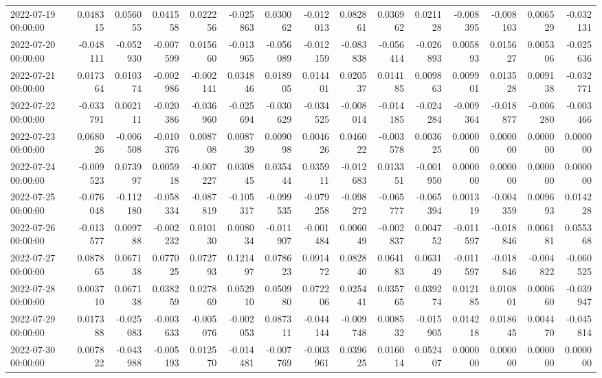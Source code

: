 \begin{tabular}{lrrrrrrrrrrrrrr}
2022-07-19 00:00:00 & 0.048315 & 0.056055 & 0.041558 & 0.022256 & -0.025863 & 0.030062 & -0.012013 & 0.082861 & 0.036962 & 0.021128 & -0.008395 & -0.008103 & 0.006529 & -0.032131 \\
2022-07-20 00:00:00 & -0.048111 & -0.052930 & -0.007599 & 0.015660 & -0.013965 & -0.056089 & -0.012159 & -0.083838 & -0.056414 & -0.026893 & 0.005893 & 0.015627 & 0.005306 & -0.025636 \\
2022-07-21 00:00:00 & 0.017364 & 0.010374 & -0.002986 & -0.002141 & 0.034846 & 0.018905 & 0.014401 & 0.020537 & 0.014185 & 0.009863 & 0.009901 & 0.013528 & 0.009138 & -0.032771 \\
2022-07-22 00:00:00 & -0.033791 & 0.002111 & -0.020386 & -0.036960 & -0.025694 & -0.030629 & -0.034525 & -0.008014 & -0.014185 & -0.024284 & -0.009364 & -0.018877 & -0.006280 & -0.003466 \\
2022-07-23 00:00:00 & 0.068026 & -0.006508 & -0.010376 & 0.008708 & 0.008739 & 0.009098 & 0.004626 & 0.046022 & -0.003578 & 0.003625 & 0.000000 & 0.000000 & 0.000000 & 0.000000 \\
2022-07-24 00:00:00 & -0.009523 & 0.073997 & 0.005918 & -0.007227 & 0.030845 & 0.035444 & 0.035911 & -0.012683 & 0.013351 & -0.001950 & 0.000000 & 0.000000 & 0.000000 & 0.000000 \\
2022-07-25 00:00:00 & -0.076048 & -0.112180 & -0.058334 & -0.087819 & -0.105317 & -0.099535 & -0.079258 & -0.098272 & -0.065777 & -0.065394 & 0.001319 & -0.004359 & 0.009693 & 0.014228 \\
2022-07-26 00:00:00 & -0.013577 & 0.009788 & -0.002232 & 0.010130 & 0.008034 & -0.011907 & -0.001484 & 0.006049 & -0.002837 & 0.004752 & -0.011597 & -0.018846 & 0.006181 & 0.055368 \\
2022-07-27 00:00:00 & 0.087865 & 0.067138 & 0.077025 & 0.072793 & 0.121497 & 0.078623 & 0.091472 & 0.082840 & 0.064183 & 0.063149 & -0.011597 & -0.018846 & -0.004822 & -0.060525 \\
2022-07-28 00:00:00 & 0.003710 & 0.067138 & 0.038259 & 0.027869 & 0.052910 & 0.050980 & 0.072206 & 0.025441 & 0.035765 & 0.039274 & 0.012185 & 0.010801 & 0.000660 & -0.039947 \\
2022-07-29 00:00:00 & 0.017388 & -0.025083 & -0.003633 & -0.005076 & -0.002053 & 0.087311 & -0.044144 & -0.009748 & 0.008532 & -0.015905 & 0.014218 & 0.018645 & 0.004470 & -0.045814 \\
2022-07-30 00:00:00 & 0.007822 & -0.043988 & -0.005193 & 0.012570 & -0.014481 & -0.007769 & -0.003961 & 0.039625 & 0.016014 & 0.052407 & 0.000000 & 0.000000 & 0.000000 & 0.000000 \\

\end{tabular}
